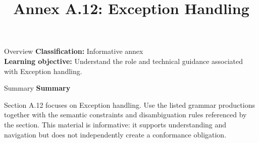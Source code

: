 \documentclass[10pt,letterpaper]{article}
\title{Annex A.12: Exception Handling}
\author{}
\date{}
\begin{document}
\maketitle
\begin{CornellOverviewBox}{Overview}
\textbf{Classification:} Informative annex\\[2pt]
\textbf{Learning objective:} Understand the role and technical guidance associated with Exception handling.
\end{CornellOverviewBox}\begin{CornellSummaryBox}{Summary}
{\sffamily\bfseries\color{Accent} Summary}\par\vspace{3pt}Section A.12 focuses on Exception handling. Use the listed grammar productions together with the semantic constraints and disambiguation rules referenced by the section. This material is informative: it supports understanding and navigation but does not independently create a conformance obligation.
\end{CornellSummaryBox}
\end{document}
